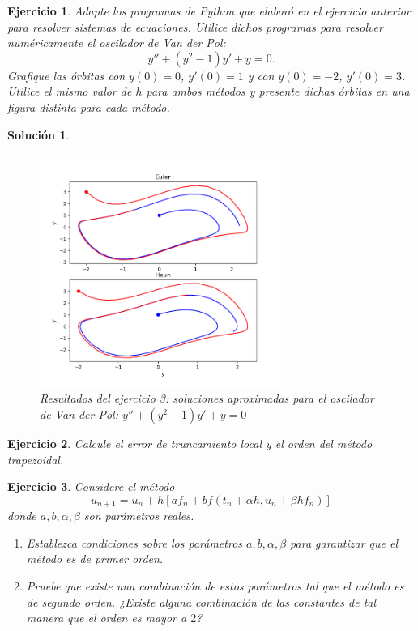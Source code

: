 \documentclass[11pt,letterpaper]{article}
\newtheorem{exercise}{Ejercicio}
\newtheorem*{sol}{Solución}
\begin{document}
\begin{exercise}
  Adapte los programas de Python que elaboró en el ejercicio anterior
  para resolver sistemas de ecuaciones. Utilice dichos programas para
  resolver numéricamente el oscilador de Van der Pol:
  \begin{equation}
    y'' + (y^{2}-1)y' + y = 0
  .\end{equation}
  Grafique las órbitas con $y(0)=0$, $y'(0)=1$ y con $y(0)=-2$,
  $y'(0)=3$. Utilice el mismo valor de $h$ para ambos métodos y
  presente dichas órbitas en una figura distinta para cada método.
\end{exercise}
\begin{sol}
  \begin{figure}[ht]
    \centering
    \includegraphics[width=0.7\textwidth]{img/jaac_tarea1_ejercicio3}
    \caption{Resultados del ejercicio 3: soluciones aproximadas para
      el oscilador de Van der Pol: $y'' + (y^{2}-1)y' + y = 0$}
    \label{fig:exe_2}
  \end{figure}
\end{sol}

\begin{exercise}
  Calcule el error de truncamiento local y el orden del método
  trapezoidal.
\end{exercise}

\begin{exercise}
  Considere el método
  \begin{equation}
    u_{n+1} = u_n + h[af_n + bf(t_n+\alpha h,u_n+\beta h f_n)]
  \end{equation}
  donde $a,b,\alpha,\beta$ son parámetros reales.
  \begin{enumerate}
    \item
      Establezca condiciones sobre los parámetros $a,b,\alpha,\beta$ 
      para garantizar que el método es de primer orden.
    \item
      Pruebe que existe una combinación de estos parámetros tal que el
      método es de segundo orden. ¿Existe alguna combinación de las
      constantes de tal manera que el orden es mayor a $2$?
  \end{enumerate}
\end{exercise}
\end{document}
